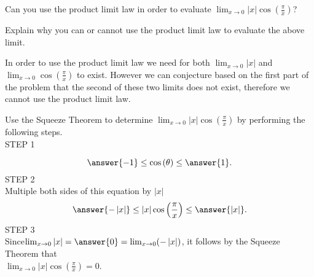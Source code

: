 \documentclass{ximera}
\begin{document}
\begin{exercise}
\begin{exercise}
\begin{exercise}

Can you use the product limit law in order to evaluate $\lim_{x\to0}\left|x\right|\cos\left(\frac{\pi}{x}\right)$?
\begin{multipleChoice}
\end{multipleChoice}

\begin{question}
Explain why you can or cannot use the product limit law to evaluate the above limit.
\begin{freeResponse}
In order to use the product limit law we need for both $\lim_{x\to0}\left|x\right|$ and $\lim_{x\to0}\cos\left(\frac{\pi}{x}\right)$ to exist.  However we can conjecture based on the first part of the problem that the second of these two limits does not exist, therefore we cannot use the product limit law.
\end{freeResponse}
\end{question}

\begin{exercise}

\begin{question}
Use the Squeeze Theorem to determine $\lim_{x\to0}\left|x\right|\cos\left(\frac{\pi}{x}\right)$ by performing the following steps.\\[1em]
STEP 1

\[
\answer{-1}\leq\cos\left(\theta\right)\leq\answer{1}.
\]  
STEP 2\\[1em]
Multiple both sides of this equation by $\left|x\right|$ 
\[
\answer{-\left|x\right|}\leq\left|x\right|\cos\left(\frac{\pi}{x}\right)\leq\answer{\left|x\right|}.
\]
STEP 3\\[1em]
Since$\lim_{x\to0}\left|x\right| = \answer{0} = \lim_{x\to0}(-\left|x\right|)$, it follows by the Squeeze Theorem that\\[1em]  $\lim_{x\to0}\left|x\right|\cos\left(\frac{\pi}{x}\right)=0$.
\end{question}
\end{exercise}
\end{exercise}
\end{exercise}
\end{exercise}
\end{document}
